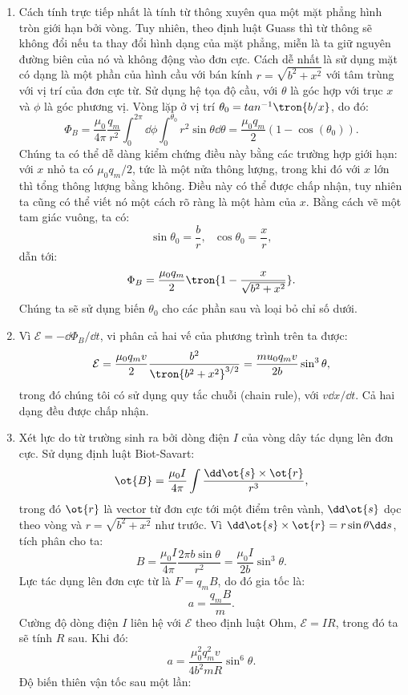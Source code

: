 \begin{loigiai}
\begin{enumerate}[1)]
    \item Cách tính trực tiếp nhất là tính từ thông xuyên qua một mặt phẳng hình tròn giới hạn bởi vòng. Tuy nhiên, theo định luật Guass thì từ thông sẽ không đổi nếu ta thay đổi hình dạng của mặt phẳng, miễn là ta giữ nguyên đường biên của nó và không động vào đơn cực. Cách dễ nhất là sử dụng mặt có dạng là một phần của hình cầu với bán kính $r=\sqrt{b^2+x^2}$ với tâm trùng với vị trí của đơn cực từ. Sử dụng hệ tọa độ cầu, với $\theta$ là góc hợp với trục $x$ và $\phi$ là góc phương vị. Vòng lặp ở vị trí $\theta_0=tan^{-1}\tron{b/x}$, do đó:
    $$
\Phi_{B}=\dfrac{\mu_{0}}{4 \pi} \frac{q_{m}}{r^{2}} \int_{0}^{2 \pi} \dd \phi \int_{0}^{\theta_{0}} r^{2} \sin \theta \dd \theta=\dfrac{\mu_{0} q_{m}}{2}\left(1-\cos \left(\theta_{0}\right)\right).
$$
Chúng ta có thể dễ dàng kiểm chứng điều này bằng các trường hợp giới hạn: với $x$ nhỏ ta có $\mu_0q_m/2$, tức là một nửa thông lượng, trong khi đó với $x$ lớn thì tổng thông lượng bằng không.
Điều này có thể được chấp nhận, tuy nhiên ta cũng có thể viết nó một cách rõ ràng là một hàm của $x$. Bằng cách vẽ một tam giác vuông, ta có:
$$\sin \theta_0=\dfrac{b}{r}, \text{     }\cos\theta_0=\dfrac{x}{r},$$
dẫn tới:
$$\Phi_B=\dfrac{\mu_0q_m}{2}\tron{1-\dfrac{x}{\sqrt{b^2+x^2}}}.$$
Chúng ta sẽ sử dụng biến $\theta_0$ cho các phần sau và loại bỏ chỉ số dưới.
\item Vì $\mathcal{E}=-\dd \Phi_B/\dd t$, vi phân cả hai vế của phương trình trên ta được:
$$\mathcal{E}=\dfrac{\mu_0q_mv}{2}\dfrac{b^2}{\tron{b^2+x^2}^{3/2}}=\dfrac{mu_0q_mv}{2b}\sin^3\theta,$$
trong đó chúng tôi có sử dụng quy tắc chuỗi (chain rule), với $v\dd x/\dd t$. Cả hai dạng đều được chấp nhận.
\item Xét lực do từ trường sinh ra bởi dòng điện $I$ của vòng dây tác dụng lên đơn cực. Sử dụng định luật Biot-Savart:
$$\ot{B}=\dfrac{\mu_0 I}{4\pi}\int \dfrac{\dd \ot{s}\times \ot{r}}{r^3},$$
trong đó $\ot{r}$ là vector từ đơn cực tới một điểm trên vành, $\dd \ot{s}$ dọc theo vòng và $r=\sqrt{b^2+x^2}$ như trước. Vì $\dd \ot{s}\times \ot{r}=r\sin\theta\dd s$, tích phân cho ta:
$$B=\dfrac{\mu_0I}{4\pi}\dfrac{2\pi b \sin \theta}{r^2}=\dfrac{\mu_0 I}{2b}\sin^3\theta.$$
Lực tác dụng lên đơn cực từ là $F=q_m B$, do đó gia tốc là:
$$a=\dfrac{q_m B}{m}.$$
Cường độ dòng điện $I$ liên hệ với $\mathcal{E}$ theo định luật Ohm, $\mathcal{E}=IR$, trong đó ta sẽ tính $R$ sau. Khi đó:
$$a=\dfrac{\mu_0^2q_m^2v}{4b^2mR}\sin^6\theta.$$
Độ biến thiên vận tốc sau một lần:

\end{enumerate}
\end{loigiai}
